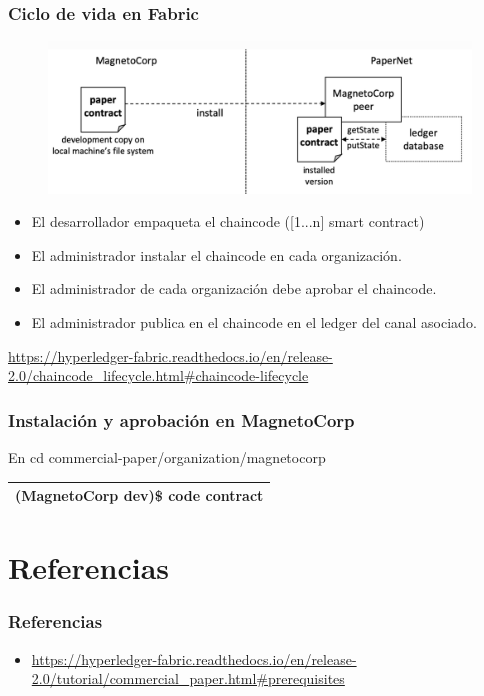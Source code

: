 \documentclass{beamer}
\begin{document}
	\begin{frame}
		\frametitle{Ciclo de vida en Fabric}
		\begin{figure}[h]
			\includegraphics[scale=.4]{papernet_02}
			\centering
		\end{figure}
		\begin{itemize}
			\item El desarrollador empaqueta el chaincode ([1...n] smart contract)
			\item El administrador instalar el chaincode en cada organización.
			\item El administrador de cada organización debe aprobar el chaincode.
			\item El administrador publica en el chaincode en el ledger del canal asociado.
		\end{itemize}
		{\tiny \url{https://hyperledger-fabric.readthedocs.io/en/release-2.0/chaincode\_lifecycle.html\#chaincode-lifecycle} }
	\end{frame}
	
	\begin{frame}
		\frametitle{Instalación y aprobación en MagnetoCorp}
		En cd commercial-paper/organization/magnetocorp\\
		\begin{center}
			\begin{tabulary}{\linewidth}{L}
				\hline
				(MagnetoCorp dev)\$ code contract \\
				\hline
			\end{tabulary} 
		\end{center}
	\end{frame}
	
	\section{Referencias}
	
	\begin{frame} [allowframebreaks]
		\frametitle{Referencias}
		\begin{itemize}
			\item \url{https://hyperledger-fabric.readthedocs.io/en/release-2.0/tutorial/commercial\_paper.html\#prerequisites}
		\end{itemize}
	\end{frame}
\end{document}
